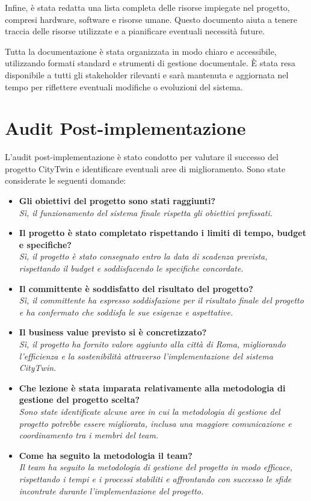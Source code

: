 Infine, è stata redatta una lista completa delle risorse impiegate nel progetto, compresi hardware, software e risorse umane. Questo documento aiuta a tenere traccia delle risorse utilizzate e a pianificare eventuali necessità future.

Tutta la documentazione è stata organizzata in modo chiaro e accessibile, utilizzando formati standard e strumenti di gestione documentale. È stata resa disponibile a tutti gli stakeholder rilevanti e sarà mantenuta e aggiornata nel tempo per riflettere eventuali modifiche o evoluzioni del sistema.

\section{Audit Post-implementazione}
L'audit post-implementazione è stato condotto per valutare il successo del progetto CityTwin e identificare eventuali aree di miglioramento. Sono state considerate le seguenti domande:
\begin{itemize}
    \item \textbf{Gli obiettivi del progetto sono stati raggiunti?}\\ \textit{Sì, il funzionamento del sistema finale rispetta gli obiettivi prefissati.}
    \item \textbf{Il progetto è stato completato rispettando i limiti di tempo, budget e specifiche?}\\ \textit{Sì, il progetto è stato consegnato entro la data di scadenza prevista, rispettando il budget e soddisfacendo le specifiche concordate.}
    \item \textbf{Il committente è soddisfatto del risultato del progetto?}\\ \textit{Sì, il committente ha espresso soddisfazione per il risultato finale del progetto e ha confermato che soddisfa le sue esigenze e aspettative.}
    \item \textbf{Il business value previsto si è concretizzato?}\\ \textit{Sì, il progetto ha fornito valore aggiunto alla città di Roma, migliorando l'efficienza e la sostenibilità attraverso l'implementazione del sistema CityTwin.}
    \item \textbf{Che lezione è stata imparata relativamente alla metodologia di gestione del progetto scelta?}\\ \textit{Sono state identificate alcune aree in cui la metodologia di gestione del progetto potrebbe essere migliorata, inclusa una maggiore comunicazione e coordinamento tra i membri del team.}
    \item \textbf{Come ha seguito la metodologia il team?}\\ \textit{Il team ha seguito la metodologia di gestione del progetto in modo efficace, rispettando i tempi e i processi stabiliti e affrontando con successo le sfide incontrate durante l'implementazione del progetto.}
\end{itemize}

